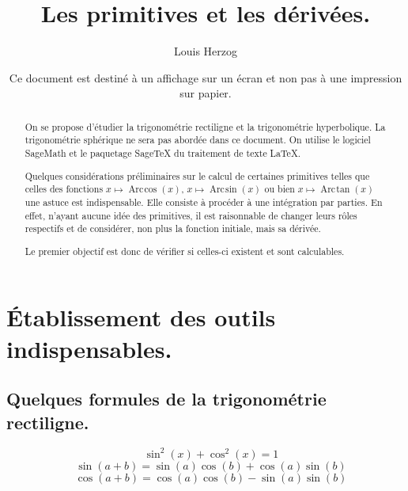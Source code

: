 \documentclass[a4paper,landscape,17pt]{extreport} %
\newcommand{\sommaire}{\shorttoc{Sommaire}{1}}
\renewcommand{\arcsin}{\mathop{\mathrm{Arc\mspace{2mu}sin}}}
\renewcommand{\arccos}{\mathop{\mathrm{Arc\mspace{2mu}cos}}}
\renewcommand{\arctan}{\mathop{\mathrm{Arc\mspace{2mu}tan}}}
\begin{document}
 


\setlength{\parindent}{0pt}



\title{Les primitives et les dérivées.}
\date{Ce document est destiné à un affichage sur un écran et non pas à une impression sur papier.}


\author{Louis Herzog} 

\maketitle 

\setcounter{tocdepth}{2}
\tableofcontents


\begin{abstract}
On se propose d'étudier la trigonométrie rectiligne et la trigonométrie hyperbolique. La trigonométrie sphérique ne sera pas abordée dans ce document. On utilise le logiciel SageMath et le paquetage {Sage\TeX} du traitement de texte \LaTeX .

Quelques considérations préliminaires sur le calcul de certaines primitives telles que celles des fonctions 
 $x \mapsto \arccos(x) $,  $x \mapsto \arcsin(x) $ ou bien $x \mapsto \arctan(x) $ une astuce est indispensable. Elle consiste à procéder à une intégration par parties. En effet, n'ayant aucune idée des primitives, il est raisonnable de changer leurs rôles respectifs et de considérer, non plus la fonction initiale, mais sa dérivée.
 
Le premier objectif est donc de vérifier si celles-ci existent et sont calculables.


\end{abstract} 

\chapter{Établissement des outils indispensables.}
 
\section{Quelques formules de la trigonométrie rectiligne.} 
\begin{equation} 
\quad \sin^2(x) + \cos^2(x)  = 1 
\end{equation}
\begin{equation} 
\quad \sin(a+b)  = \sin(a)\cos(b) + \cos(a)\sin(b) 
\end{equation}
\begin{equation} 
\quad \cos(a+b)  = \cos(a)\cos(b) - \sin(a)\sin(b)  
\end{equation}
\end{document}
